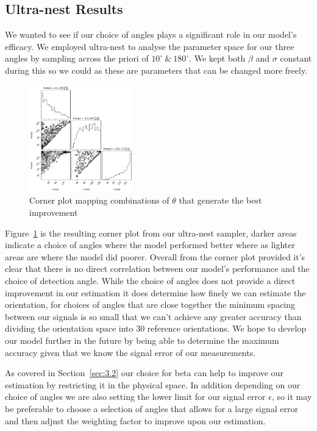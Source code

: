 \documentclass[final, 3p]{elsarticle}
\begin{document}
\subsection{Ultra-nest Results}
\label{sec:3.3}
We wanted to see if our choice of angles plays a significant role in our model's efficacy. We employed ultra-nest to analyse the parameter space for our three angles by sampling across the priori of $10^{\circ} \ \& \ 180^{\circ}$. We kept both $\beta$ and $\sigma$ constant during this so we could as these are parameters that can be changed more freely. 

\begin{figure}[h]
	\centering
	\includegraphics[width=0.4\textwidth]{./Images/corneranglesfreed-1.png}
	\caption{Corner plot mapping combinations of $\theta$ that generate the best improvement}
	\label{fig:corner}
\end{figure}

Figure~\ref{fig:corner} is the resulting corner plot from our ultra-nest sampler, darker areas indicate a choice of angles where the model performed better where as lighter areas are where the model did poorer. Overall from the corner plot provided it's clear that there is no direct correlation between our model's performance and the choice of detection angle. While the choice of angles does not provide a direct improvement in our estimation it does determine how finely we can estimate the orientation, for choices of angles that are close together the minimum spacing between our signals is so small that we can't achieve any greater accuracy than dividing the orientation space into 30 reference orientations. We hope to develop our model further in the future by being able to determine the maximum accuracy given that we know the signal error of our measurements.  

As covered in Section~\ref{sec:3.2} our choice for beta can help to improve our estimation by restricting it in the physical space. In addition depending on our choice of angles we are also setting the lower limit for our signal error $\epsilon$, so it may be preferable to choose a selection of angles that allows for a large signal error and then adjust the weighting factor to improve upon our estimation. 
\end{document}
